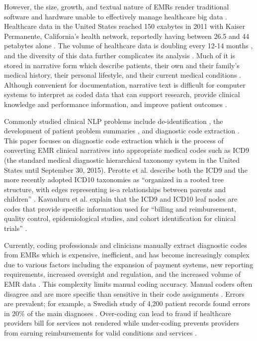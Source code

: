 \documentclass[sigconf]{acmart}
\begin{document}
However, the size, growth, and textual nature of EMRs render traditional software and hardware unable to effectively manage healthcare big data \cite{raghupathi2014big}. Healthcare data in the United States reached 150 exabytes in 2011 with Kaiser Permanente, California's health network, reportedly having between 26.5 and 44 petabytes alone \cite{cottle2013transforming}. The volume of healthcare data is doubling every 12-14 months \cite{dinov2016volume}, and the diversity of this data further complicates its analysis \cite{frost2015drowning}. Much of it is stored in narrative form which describe patients, their own and their family's medical history, their personal lifestyle, and their current medical conditions \cite{meystre2008extracting}. Although convenient for documentation, narrative text is difficult for computer systems to interpret as coded data that can support research, provide clinical knowledge and performance information, and improve patient outcomes \cite{meystre2008extracting} \cite{stanfill2010systematic}.

Commonly studied clinical NLP problems include de-identification \cite{velupillai2015recent}, the development of patient problem summaries \cite{diomaiuta2017novel}, and diagnostic code extraction \cite{perotte2013diagnosis}. This paper focuses on diagnostic code extraction which is the process of converting EMR clinical narratives into appropriate medical codes such as ICD9 (the standard medical diagnostic hierarchical taxonomy system in the United States until September 30, 2015). Perotte et al. describe both the ICD9 and the more recently adopted ICD10 taxonomies as ``organized in a rooted tree structure, with edges representing is-a relationships between parents and children'' \cite{perotte2013diagnosis}. Kavauluru et al. explain that the ICD9 and ICD10 leaf nodes are codes that provide specific information used for ``billing and reimbursement, quality control, epidemiological studies, and cohort identification for clinical trials'' \cite{kavuluru2015empirical}.

Currently, coding professionals and clinicians manually extract diagnostic codes from EMRs which is expensive, inefficient, and has become increasingly complex due to various factors including the expansion of payment systems, new reporting requirements, increased oversight and regulation, and the increased volume of EMR data \cite{AHIMA} \cite{pons2016natural} \cite{stanfill2010systematic} \cite{velupillai2015recent}. This complexity limits manual coding accuracy. Manual coders often disagree \cite{pestian2007shared} and are more specific than sensitive in their code assignments \cite{birman2005accuracy}. Errors are prevalent; for example, a Swedish study of 4,200 patient records found errors in 20\% of the main diagnoses \cite{velupillai2015recent}. Over-coding can lead to fraud if healthcare providers bill for services not rendered while under-coding prevents providers from earning reimbursements for valid conditions and services \cite{perotte2013diagnosis}.
\end{document}
